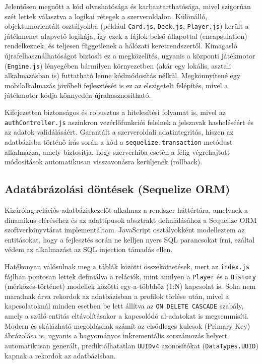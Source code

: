Jelentősen megnőtt a kód olvashatósága és karbantarthatósága, mivel szigorúan szét lettek választva a logikai rétegek a szerveroldalon. Különálló, objektumorientált osztályokba (például \texttt{Card.js}, \texttt{Deck.js}, \texttt{Player.js}) került a játékmenet alapvető logikája, így ezek a fájlok belső állapottal (encapsulation) rendelkeznek, és teljesen függetlenek a hálózati keretrendszertől. Kimagasló újrafelhasználhatóságot biztosít ez a megközelítés, ugyanis a központi játékmotor (\texttt{Engine.js}) lényegében bármilyen környezetben (akár egy lokális, asztali alkalmazásban is) futtatható lenne kódmódosítás nélkül. Megkönnyítené egy mobilalkalmazás jövőbeli fejlesztését is ez az elszigetelt felépítés, mivel a játékmotor kódja könnyedén újrahasznosítható.

Kifejezetten biztonságos és robusztus a hitelesítési folyamat is, mivel az \texttt{authController.js} aszinkron vezérlőfunkciói felelnek a jelszavak hasheléséért és az adatok validálásáért. Garantált a szerveroldali adatintegritás, hiszen az adatbázisba történő írás során a kód a \texttt{sequelize.transaction} metódust alkalmazza, amely biztosítja, hogy szerverhiba esetén a félig végrehajtott módosítások automatikusan visszavonásra kerüljenek (rollback).

\subsection{Adatábrázolási döntések (Sequelize ORM)}
\label{subsec:data_representation}

Kizárólag relációs adatbáziskezelőt alkalmaz a rendszer háttértára, amelynek a dinamikus eléréséhez és az adattípusok absztrakt definiálásához a Sequelize ORM szoftverkönyvtárat implementáltam\cite{sequelize}. JavaScript osztályokként modelleztem az entitásokat, hogy a fejlesztés során ne kelljen nyers SQL parancsokat írni, ezáltal védem az alkalmazást az SQL injection támadás ellen.

Hatékonyan valósulnak meg a táblák közötti összeköttetések, mert az \texttt{index.js} fájlban pontosan lettek definiálva a relációk, mint amilyen a \texttt{Player} és a \texttt{History} (mérkőzés-történet) modellek közötti egy-a-többhöz (1:N) kapcsolat is. Soha nem maradnak árva rekordok az adatbázisban a profilok törlése után, mivel a kapcsolatoknál minden esetben be lett állítva az \texttt{ON DELETE CASCADE} szabály, amely a szülő entitás eltávolításakor a kapcsolódó al-adatokat is megsemmisíti. Modern és skálázható megoldásnak számít az elsődleges kulcsok (Primary Key) ábrázolása is, ugyanis a hagyományos inkrementális sorszámozás helyett automatikusan generált, prediktálhatatlan \texttt{UUIDv4} azonosítókat (\texttt{DataTypes.UUID}) kapnak a rekordok az adatbázisban.

